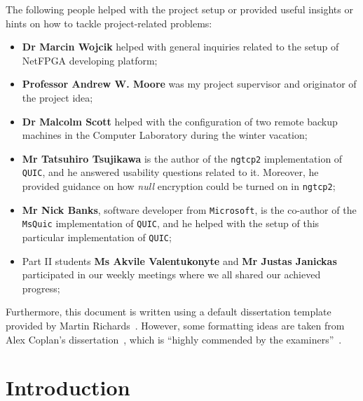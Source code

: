 \documentclass[12pt,a4paper,twoside,openright]{report}
\begin{document}
The following people helped with the project setup or provided useful insights or hints on how to tackle project-related problems:
\begin{itemize}
    \item \textbf{Dr Marcin Wojcik} helped with general inquiries related to the setup of NetFPGA developing platform;
    \item \textbf{Professor Andrew W. Moore} was my project supervisor and originator of the project idea;
    \item \textbf{Dr Malcolm Scott} helped with the configuration of two remote backup machines in the Computer Laboratory during the winter vacation;
    \item \textbf{Mr Tatsuhiro Tsujikawa} is the author of the \texttt{ngtcp2} implementation of \texttt{QUIC}, and he answered usability questions related to it. Moreover, he provided guidance on how \textit{null} encryption could be turned on in \texttt{ngtcp2};
    \item \textbf{Mr Nick Banks}, software developer from \texttt{Microsoft}, is the co-author of the \texttt{MsQuic} implementation of \texttt{QUIC}, and he helped with the setup of this particular implementation of \texttt{QUIC};
    \item Part II students \textbf{Ms Akvile Valentukonyte} and \textbf{Mr Justas Janickas} participated in our weekly meetings where we all shared our achieved progress;
\end{itemize}

Furthermore, this document is written using a default dissertation template provided by Martin Richards~\cite{how_to_write_a_dissertation_in_LATEX}.
However, some formatting ideas are taken from Alex Coplan's dissertation~\cite{Alex_Coplan_dissertation}, which is \enquote{highly commended by the examiners}~\cite{Computer_Lab_dissertations}.


\pagestyle{headings}

\chapter{Introduction}

%
\end{document}
